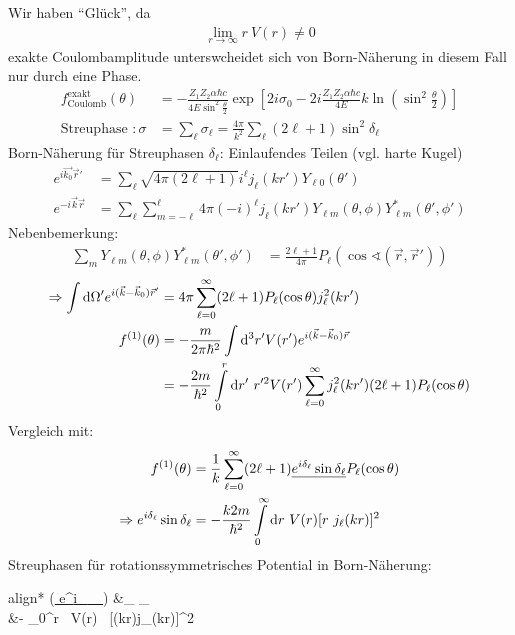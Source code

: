 	Wir haben ``Glück'', da
		\begin{align*}
			\underset{r \rightarrow \infty}{\lim} r ~V(r) \neq 0
		\end{align*}
	exakte Coulombamplitude unterswcheidet sich von Born-Näherung in diesem Fall nur durch eine Phase.
		\begin{align*}
			f^{\text{exakt}}_{\text{Coulomb}} (\theta) 
			&= -\frac{Z_1 Z_2 \alpha \hbar c}{4 E \sin^2 \frac{\theta}{2}} 
			\exp \left[ 2 i \sigma_0 - 
			2 i \frac{Z_1 Z_2 \alpha \hbar c}{4 E} k 
			\ln \left(\sin^2 \frac{\theta}{2} \right)
			\right] \\
			\text{Streuphase }: \sigma 
			&= \sum_\ell \sigma_\ell 
			= \frac{4 \pi}{k^2} \sum_\ell (2 \ell + 1) \sin^2 \delta_\ell
		\end{align*}
	Born-Näherung für Streuphasen $\delta_\ell$: Einlaufendes Teilen (vgl. harte Kugel)
		\begin{align*}
			e^{i \vec{k_0} \vec{r}'} 
			&= \sum_\ell \sqrt{4 \pi (2 \ell + 1)} 
			i^\ell j_\ell (kr') Y_{\ell 0} (\theta') \\
			e^{-i \vec{k} \vec{r}} 
			&= \sum_\ell \sum_{m = -\ell}^\ell
			4 \pi (-i)^\ell j_\ell (kr') Y_{\ell m} (\theta, \phi) Y^*_{\ell m} (\theta', \phi')
		\end{align*}
	Nebenbemerkung:
		\begin{align*}
			\sum_m Y_{\ell m} (\theta, \phi) Y^*_{\ell m} (\theta', \phi') 
			&= \frac{2 \ell + 1}{4 \pi} P_\ell (\cos \sphericalangle (\vec{r},\vec{r}'))
		\end{align*}
		\begin{align*}
			\Rightarrow \int \mathrm{d} \Omega' 
			e^{i(\vec{k}-\vec{k}_0) \vec{r}'} 
			&= 4 \pi \sum_{\ell=0}^\infty (2\ell + 1)
			P_\ell (\cos \theta) j_\ell^2 (kr') \\
			f^{(1)} (\theta) 
			&= -\frac{m}{2 \pi \hbar^2} 
			\int \mathrm{d}^3 r' V(r') e^{i(\vec{k}-\vec{k}_0)\vec{r}} \\
			&= - \frac{2 m}{\hbar^2}
			\int \limits_0^r \mathrm{d} r' ~r'^2 V(r') 
			\sum_{\ell = 0}^\infty j_\ell^2 (k r') 
			(2 \ell + 1) P_\ell (\cos \theta) 
		\end{align*}
	Vergleich mit:
		\begin{align*}
			f^{(1)}(\theta) 
			&= \frac{1}{k} \sum_{\ell=0}^{\infty} (2\ell + 1)
			\underline{e^{i\delta_\ell} \sin \delta_\ell} P_\ell (\cos \theta) \\
			\Rightarrow e^{i\delta_\ell} \sin \delta_\ell
			&= - \frac{k 2 m}{\hbar^2} 
			\int \limits_0^\infty \mathrm{d} r ~V(r) 
			[r ~j_\ell(kr)]^2
		\end{align*}
	Streuphasen für rotationssymmetrisches Potential in Born-Näherung:
		\begin{empheq}[box=\boxed]{align*}
			 (\underline{ e^{i\delta_\ell} \sin \delta_\ell})
			&\approx \delta_\ell
			\leftarrow \delta_\ell {} \\
			&\approx -
			\int \limits_0^\infty \diff r ~V(r) 
			~[(kr)j_\ell(kr)]^2
		\end{empheq}